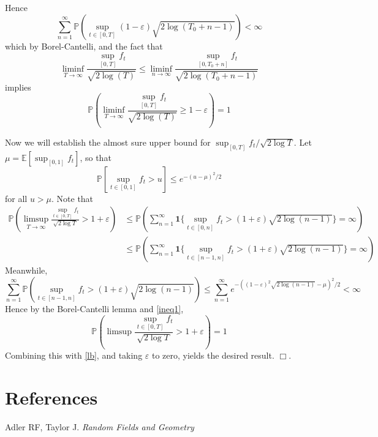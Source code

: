 \documentclass[11pt]{article}
\begin{document}
Hence
\begin{equation}\label{bcres1}
\sum_{n=1}^\infty \mathbb{P}(\sup_{t \in [0,T]} (1-\varepsilon)\sqrt{2\log(T_0+n-1)}) < \infty
\end{equation}
which by Borel-Cantelli, and the fact that
\[
\liminf_{T \to \infty} \frac{\sup_{[0,T]} f_t}{\sqrt{2 \log(T)}} \leq \liminf_{n \to \infty} \frac{\sup_{[0,T_0+n]} f_t}{\sqrt{2 \log(T_0+n-1)}}
\]
implies
\begin{equation}\label{lb}
\mathbb{P}\left(\liminf_{T \to \infty}\frac{\sup_{[0,T]}
    f_t}{\sqrt{2 \log(T)}} \geq 1-\varepsilon
\right) = 1
\end{equation}

Now we will establish the almost sure upper bound for $\sup_{[0,T]} f_t/\sqrt{2\log T}$.
Let $\mu=\mathbb{E}[\sup_{[0,1]} f_t]$, so that
\[
\mathbb{P}[\sup_{t \in [0,1]} f_t > u] \leq e^{-(u-\mu)^2/2}
\]
for all $u > \mu$.
Note that
\begin{align}
\mathbb{P}\left(\limsup_{T \to \infty} \frac{\sup_{t \in [0,T]} f_t}{\sqrt{2\log T}} > 1+\varepsilon \right)  &\leq \mathbb{P}\left(\sum_{n=1}^\infty \mathbf{1}\{\sup_{t \in [0,n]} f_t > (1+\varepsilon) \sqrt{2\log (n-1)}\} = \infty \right)
\\& \leq \mathbb{P}\left(\sum_{n=1}^\infty \mathbf{1}\{\sup_{t \in [n-1,n]} f_t > (1+\varepsilon) \sqrt{2\log (n-1)}\} = \infty \right)\label{ineq1}
\end{align}
Meanwhile,
\[
\sum_{n=1}^\infty \mathbb{P}\left(\sup_{t \in [n-1,n]} f_t > (1+\varepsilon) \sqrt{2\log (n-1)} \right) \leq  \sum_{n=1}^\infty e^{-((1-\varepsilon)^2\sqrt{2\log(n-1)}-\mu)^2/2} < \infty
\]
Hence by the Borel-Cantelli lemma and \eqref{ineq1},
\[
\mathbb{P}\left(\limsup \frac{\sup_{t \in [0,T]} f_t}{\sqrt{2\log T}} > 1+\varepsilon \right) =1
\]
Combining this with \eqref{lb}, and taking $\varepsilon$ to zero, yields the desired result. $\Box$.

\section{References}

Adler RF, Taylor J. \emph{Random Fields and Geometry}
\end{document}

